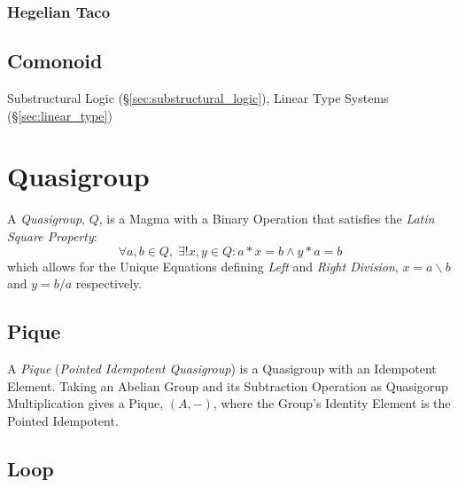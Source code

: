 \subsubsection{Hegelian Taco}\label{sec:hegelian_taco}



\subsection{Comonoid}\label{sec:comonoid}

Substructural Logic (\S\ref{sec:substructural_logic}), Linear Type
Systems (\S\ref{sec:linear_type})



\section{Quasigroup}\label{sec:quasigroup}

A \emph{Quasigroup}, $Q$, is a Magma with a Binary Operation that satisfies
the \emph{Latin Square Property}:
\[
  \forall a, b \in Q,\;\exists ! x,y \in Q : a * x = b \wedge y * a = b
\]
which allows for the Unique Equations defining \emph{Left} and
\emph{Right Division}, $x = a \backslash b$ and $y = b / a$
respectively.



\subsection{Pique}\label{sec:pique}

A \emph{Pique} (\emph{Pointed Idempotent Quasigroup}) is a Quasigroup
with an Idempotent Element. Taking an Abelian Group and its
Subtraction Operation as Quasigorup Multiplication gives a Pique,
$(A,-)$, where the Group's Identity Element is the Pointed Idempotent.



\subsection{Loop}\label{sec:quasigroup_loop}

